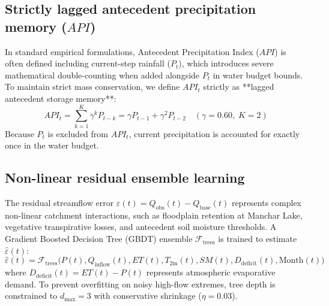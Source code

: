 \documentclass[11pt,a4paper,fleqn]{article}
\begin{document}
\subsection{Strictly lagged antecedent precipitation memory ($API$)}
In standard empirical formulations, Antecedent Precipitation Index ($API$) is often defined including current-step rainfall ($P_t$), which introduces severe mathematical double-counting when added alongside $P_t$ in water budget bounds. To maintain strict mass conservation, we define $API_t$ strictly as **lagged antecedent storage memory**:
\begin{equation}
API_t = \sum_{k=1}^{K} \gamma^k P_{t-k} = \gamma P_{t-1} + \gamma^2 P_{t-2} \quad (\gamma = 0.60, \; K = 2)
\end{equation}
Because $P_t$ is excluded from $API_t$, current precipitation is accounted for exactly once in the water budget.

\subsection{Non-linear residual ensemble learning}
The residual streamflow error $\varepsilon(t) = Q_{\text{obs}}(t) - Q_{\text{base}}(t)$ represents complex non-linear catchment interactions, such as floodplain retention at Manchar Lake, vegetative transpirative losses, and antecedent soil moisture thresholds. A Gradient Boosted Decision Tree (GBDT) ensemble $\mathcal{F}_{\text{trees}}$ is trained to estimate $\hat{\varepsilon}(t)$:
\begin{equation}
\hat{\varepsilon}(t) = \mathcal{F}_{\text{trees}}\Big(P(t), Q_{\text{inflow}}(t), ET(t), T_{\text{2m}}(t), SM(t), D_{\text{deficit}}(t), \text{Month}(t)\Big)
\end{equation}
where $D_{\text{deficit}}(t) = ET(t) - P(t)$ represents atmospheric evaporative demand. To prevent overfitting on noisy high-flow extremes, tree depth is constrained to $d_{\max} = 3$ with conservative shrinkage ($\eta = 0.03$).
\end{document}
